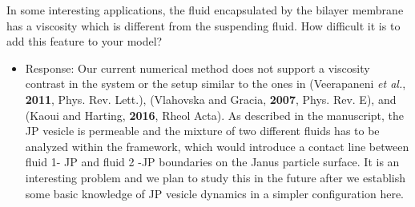 \documentclass[11pt]{article}
\newcommand{\comment}[1]{{\color{blue} #1}}
\begin{document}
\noindent
\comment{In some interesting applications, the fluid encapsulated by the
bilayer membrane has a viscosity which is different from the suspending
fluid. How difficult it is to add this feature to your model?}
\begin{itemize}
  \item Response: Our current numerical method does not support a viscosity contrast in the system 
or the setup similar to the ones in (Veerapaneni {\sl et al.}, {\bf 2011}, Phys. Rev. Lett.),
(Vlahovska and Gracia, {\bf 2007}, Phys. Rev. E), and
(Kaoui and Harting, {\bf 2016}, Rheol Acta). 
As described in the manuscript, the JP vesicle is permeable and the mixture of two different
fluids has to be analyzed within the framework, which would introduce a contact line between fluid 1- JP and fluid 2 -JP boundaries on the Janus particle surface. It is an interesting problem and we plan to study this in the future after we establish some basic knowledge of JP vesicle dynamics in a simpler configuration here.

\end{itemize}
\end{document}
